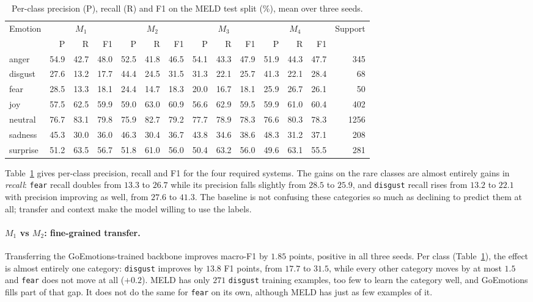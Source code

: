 \documentclass[sigconf,nonacm]{acmart}
\begin{document}
\begin{table}[t]
\centering
\caption{Per-class precision (P), recall (R) and F1 on the MELD test split (\%), mean over three seeds.}
\label{tab:perclass}
\small
\begin{tabular}{lrrrrrrrrrrrrr}
\toprule
Emotion & \multicolumn{3}{c}{$M_1$} & \multicolumn{3}{c}{$M_2$} & \multicolumn{3}{c}{$M_3$} & \multicolumn{3}{c}{$M_4$} & Support \\
\cmidrule(lr){2-4} \cmidrule(lr){5-7} \cmidrule(lr){8-10} \cmidrule(lr){11-13}
 & P & R & F1 & P & R & F1 & P & R & F1 & P & R & F1 & \\
\midrule
anger & 54.9 & 42.7 & 48.0 & 52.5 & 41.8 & 46.5 & 54.1 & 43.3 & 47.9 & 51.9 & 44.3 & 47.7 & 345 \\
disgust & 27.6 & 13.2 & 17.7 & 44.4 & 24.5 & 31.5 & 31.3 & 22.1 & 25.7 & 41.3 & 22.1 & 28.4 & 68 \\
fear & 28.5 & 13.3 & 18.1 & 24.4 & 14.7 & 18.3 & 20.0 & 16.7 & 18.1 & 25.9 & 26.7 & 26.1 & 50 \\
joy & 57.5 & 62.5 & 59.9 & 59.0 & 63.0 & 60.9 & 56.6 & 62.9 & 59.5 & 59.9 & 61.0 & 60.4 & 402 \\
neutral & 76.7 & 83.1 & 79.8 & 75.9 & 82.7 & 79.2 & 77.7 & 78.9 & 78.3 & 76.6 & 80.3 & 78.3 & 1256 \\
sadness & 45.3 & 30.0 & 36.0 & 46.3 & 30.4 & 36.7 & 43.8 & 34.6 & 38.6 & 48.3 & 31.2 & 37.1 & 208 \\
surprise & 51.2 & 63.5 & 56.7 & 51.8 & 61.0 & 56.0 & 50.4 & 63.2 & 56.0 & 49.6 & 63.1 & 55.5 & 281 \\
\bottomrule
\end{tabular}
\end{table}


Table~\ref{tab:perclass} gives per-class precision, recall and F1 for the four required
systems. The gains on the rare classes are almost entirely gains in \emph{recall}:
\texttt{fear} recall doubles from $13.3$ to $26.7$ while its precision falls slightly from
$28.5$ to $25.9$, and \texttt{disgust} recall rises from $13.2$ to $22.1$ with precision
improving as well, from $27.6$ to $41.3$. The baseline is not confusing these categories so
much as declining to predict them at all; transfer and context make the model willing to
use the labels.

\paragraph{$M_1$ vs $M_2$: fine-grained transfer.}
Transferring the GoEmotions-trained backbone improves macro-F1 by $1.85$ points, positive
in all three seeds. Per class (Table~\ref{tab:perclass}), the effect is almost entirely
one category: \texttt{disgust} improves by $13.8$ F1 points, from $17.7$ to $31.5$, while
every other category moves by at most $1.5$ and \texttt{fear} does not move at all
($+0.2$). MELD has only $271$ \texttt{disgust} training examples, too few to learn the
category well, and GoEmotions fills part of that gap. It does not do the same for
\texttt{fear} on its own, although MELD has just as few examples of it.
\end{document}
